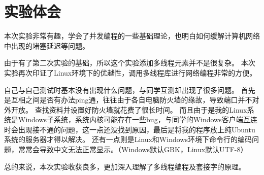 \documentclass[logo,reportComp]{thesis}
\begin{document}
\section{实验体会}

本次实验非常有趣，学会了并发编程的一些基础理论，也明白如何缓解计算机网络中出现的堵塞延迟等问题。

由于有了第二次实验的基础，所以这个实验添加多线程元素并不是很复杂。
本次实验再次印证了Linux环境下的优越性，调用多线程库进行网络编程非常的方便。

自己与自己测试时基本没有出现什么问题，与同学互测却出现了很多问题。
首先是互相之间是否有办法ping通，往往由于各自电脑防火墙的缘故，导致端口并不对外开放。
查找资料并设置好防火墙就花费了很长时间。
而且由于是我的Linux系统是Windows子系统，系统内核可能存在一些bug，与同学的Windows客户端互连时会出现接不通的问题，这一点还没找到原因，最后是将我的程序放上纯Ubuntu系统的服务器才得以解决。
还有一点则是Linux和Windows环境下命令行的编码问题，常常会导致中文无法正常显示。（Windows默认GBK，Linux默认UTF-8）

总的来说，本次实验收获良多，更加深入理解了多线程编程及套接字的原理。
\end{document}
